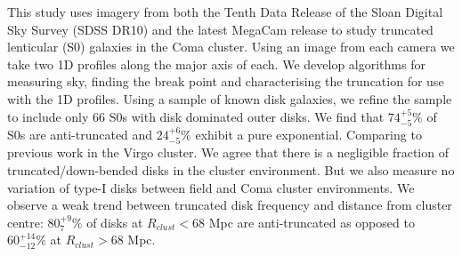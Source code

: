 
This study uses \iband imagery from both the Tenth Data Release of the Sloan Digital Sky Survey (SDSS DR10) and the latest MegaCam release to study truncated lenticular (S0) galaxies in the Coma cluster. Using an image from each camera we take two 1D profiles along the major axis of each. We develop algorithms for measuring sky, finding the break point and characterising the truncation for use with the 1D profiles. Using a sample of known disk galaxies, we refine the sample to include only 66 S0s with disk dominated outer disks. We find that $74^{+5}_{-5}\%$ of S0s are anti-truncated and $24^{+6}_{-5}\%$ exhibit a pure exponential. Comparing to previous work in the Virgo cluster. We agree that there is a negligible fraction of truncated/down-bended disks in the cluster environment. But we also measure no variation of type-I disks between field and Coma cluster environments. We observe a weak trend between truncated disk frequency and distance from cluster centre: $80^{+9}_{7}\%$ of disks at $R_{clust} < 68$ Mpc are anti-truncated as opposed to $60^{+14}_{-12}\%$ at $R_{clust} > 68$ Mpc.
